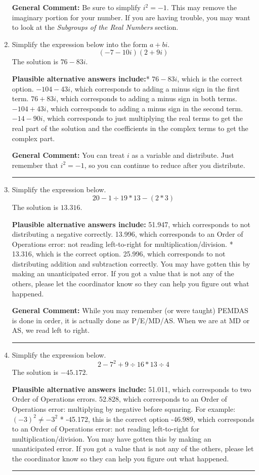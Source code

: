 \documentclass{extbook}[14pt]
\newcommand{\litem}[1]{\item #1

\rule{\textwidth}{0.4pt}}
\begin{document}
\begin{enumerate}
{\textbf{General Comment:} Be sure to simplify $i^2 = -1$. This may remove the imaginary portion for your number. If you are having trouble, you may want to look at the \textit{Subgroups of the Real Numbers} section.
}
\litem{
Simplify the expression below into the form $a+bi$.
\[ (-7 - 10 i)(2 + 9 i) \]The solution is \( 76 - 83 i \).\begin{enumerate}[label=\Alph*.]
\textbf{Plausible alternative answers include:}* $76 - 83 i$, which is the correct option.
 $-104 - 43 i$, which corresponds to adding a minus sign in the first term.
 $76 + 83 i$, which corresponds to adding a minus sign in both terms.
 $-104 + 43 i$, which corresponds to adding a minus sign in the second term.
 $-14 - 90 i$, which corresponds to just multiplying the real terms to get the real part of the solution and the coefficients in the complex terms to get the complex part.
\end{enumerate}

\textbf{General Comment:} You can treat $i$ as a variable and distribute. Just remember that $i^2=-1$, so you can continue to reduce after you distribute.
}
\litem{
Simplify the expression below.
\[ 20 - 1 \div 19 * 13 - (2 * 3) \]The solution is \( 13.316 \).\begin{enumerate}[label=\Alph*.]
\textbf{Plausible alternative answers include:} 51.947, which corresponds to not distributing a negative correctly.
 13.996, which corresponds to an Order of Operations error: not reading left-to-right for multiplication/division.
* 13.316, which is the correct option.
 25.996, which corresponds to not distributing addition and subtraction correctly.
 You may have gotten this by making an unanticipated error. If you got a value that is not any of the others, please let the coordinator know so they can help you figure out what happened.
\end{enumerate}

\textbf{General Comment:} While you may remember (or were taught) PEMDAS is done in order, it is actually done as P/E/MD/AS. When we are at MD or AS, we read left to right.
}
\litem{
Simplify the expression below.
\[ 2 - 7^2 + 9 \div 16 * 13 \div 4 \]The solution is \( -45.172 \).\begin{enumerate}[label=\Alph*.]
\textbf{Plausible alternative answers include:} 51.011, which corresponds to two Order of Operations errors.
 52.828, which corresponds to an Order of Operations error: multiplying by negative before squaring. For example: $(-3)^2 \neq -3^2$
* -45.172, this is the correct option
 -46.989, which corresponds to an Order of Operations error: not reading left-to-right for multiplication/division.
 You may have gotten this by making an unanticipated error. If you got a value that is not any of the others, please let the coordinator know so they can help you figure out what happened.
\end{enumerate}

}
\end{enumerate}
\end{document}
